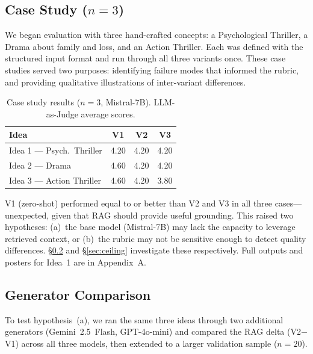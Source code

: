 \documentclass[10pt,twocolumn]{article}
\begin{document}
\subsection{Case Study ($n{=}3$)}
\label{sec:casestudy}
We began evaluation with three hand-crafted concepts: a Psychological Thriller, a Drama about family and loss, and an Action Thriller. Each was defined with the structured input format and run through all three variants once. These case studies served two purposes: identifying failure modes that informed the rubric, and providing qualitative illustrations of inter-variant differences.

\begin{table}[h]
\centering
\small
\caption{Case study results ($n{=}3$, Mistral-7B). LLM-as-Judge average scores.}
\label{tab:casestudy}
\begin{tabular}{lccc}
\toprule
\textbf{Idea} & \textbf{V1} & \textbf{V2} & \textbf{V3} \\
\midrule
Idea 1 --- Psych.\ Thriller & 4.20 & 4.20 & 4.20 \\
Idea 2 --- Drama & 4.60 & 4.20 & 4.20 \\
Idea 3 --- Action Thriller & 4.60 & 4.20 & 3.80 \\
\bottomrule
\end{tabular}
\end{table}

V1 (zero-shot) performed equal to or better than V2 and V3 in all three cases---unexpected, given that RAG should provide useful grounding. This raised two hypotheses: (a)~the base model (Mistral-7B) may lack the capacity to leverage retrieved context, or (b)~the rubric may not be sensitive enough to detect quality differences. \S\ref{sec:generator} and \S\ref{sec:ceiling} investigate these respectively. Full outputs and posters for Idea~1 are in Appendix~A.

\subsection{Generator Comparison}
\label{sec:generator}
To test hypothesis~(a), we ran the same three ideas through two additional generators (Gemini~2.5~Flash, GPT-4o-mini) and compared the RAG delta (V2$-$V1) across all three models, then extended to a larger validation sample ($n{=}20$).
\end{document}
